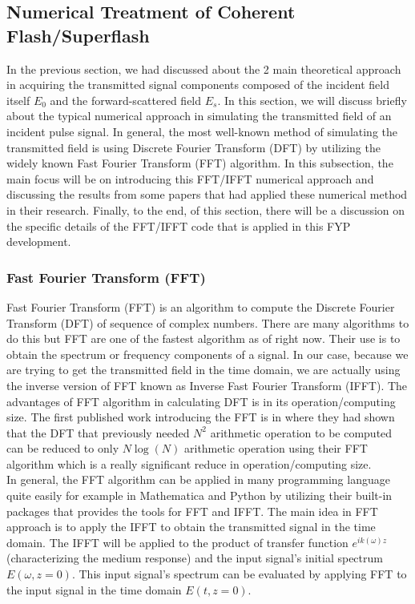 \subsection{Numerical Treatment of Coherent Flash/Superflash}
In the previous section, we had discussed about the 2 main theoretical approach in acquiring the transmitted signal components composed of the incident field itself $E_{0}$ and the forward-scattered field $E_{s}$. In this section, we will discuss briefly about the typical numerical approach in simulating the transmitted field of an incident pulse signal. In general, the most well-known method of simulating the transmitted field is using Discrete Fourier Transform (DFT) by utilizing the widely known Fast Fourier Transform (FFT) algorithm. In this subsection, the main focus will be on introducing this FFT/IFFT numerical approach and discussing the results from some papers that had applied these numerical method in their research. Finally, to the end, of this section, there will be a discussion on the specific details of the FFT/IFFT code that is applied in this FYP development.

\subsubsection{Fast Fourier Transform (FFT)}
Fast Fourier Transform (FFT) is an algorithm to compute the Discrete Fourier Transform (DFT) of sequence of complex numbers. There are many algorithms to do this but FFT are one of the fastest algorithm as of right now. Their use is to obtain the spectrum or frequency components of a signal. In our case, because we are trying to get the transmitted field in the time domain, we are actually using the inverse version of FFT known as Inverse Fast Fourier Transform (IFFT). The advantages of FFT algorithm in calculating DFT is in its operation/computing size. The first published work introducing the FFT is in \cite{Cooley1965} where they had shown that the DFT that previously needed $N^2$ arithmetic operation to be computed can be reduced to only $N \log(N)$ arithmetic operation using their FFT algorithm which is a really significant reduce in operation/computing size.\\

In general, the FFT algorithm can be applied in many programming language quite easily for example in Mathematica and Python by utilizing their built-in packages that provides the tools for FFT and IFFT. The main idea in FFT approach is to apply the IFFT to obtain the transmitted signal in the time domain. The IFFT will be applied to the product of transfer function $e^{i k(\omega)z}$ (characterizing the medium response) and the input signal's initial spectrum $E(\omega, z = 0)$. This input signal's spectrum can be evaluated by applying FFT to the input signal in the time domain $E(t, z = 0)$.

